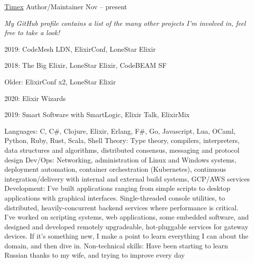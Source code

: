 \documentclass[10pt,a4paper]{article}
\begin{document}
\headedsection
  {\href{https://github.com/bitwalker/timex}{Timex}}{%
  \headedsubsection
    {Author/Maintainer}
    {Nov  -- present}
    {}}
    
\vspace{-0.2em}
\begin{center}
  \emph{\small My GitHub profile contains a list of the many other projects I'm involved in, feel free to take a look!}
\end{center}

\spacedhrule{-0.2em}{-0.4em}


\inlineheadsection
  {2019:}
  {CodeMesh LDN, ElixirConf, LoneStar Elixir}
  
\inlineheadsection
  {2018:}
  {The Big Elixir, LoneStar Elixir, CodeBEAM SF}
  
\inlineheadsection
  {Older:}
  {ElixirConf x2, LoneStar Elixir}
  
  

\inlineheadsection
  {2020:}
  {Elixir Wizards}
  
  
\inlineheadsection
  {2019:}
  {Smart Software with SmartLogic, Elixir Talk, ElixirMix}




\inlineheadsection  %
  {Languages:}
  {C, C\#, Clojure, Elixir, Erlang, F\#, Go, Javascript, Lua, OCaml, Python, Ruby, Rust, Scala, Shell}
\inlineheadsection
  {Theory:}
  {Type theory, compilers, interpreters, data structures and algorithms, distributed consensus, messaging and protocol design}
\inlineheadsection
  {Dev/Ops:}
  {Networking, administration of Linux and Windows systems, deployment automation, container orchestration (Kubernetes), continuous integration/delivery with internal and external build systems, GCP/AWS services}
\inlineheadsection
  {Development:}
  {I've built applications ranging from simple scripts to desktop applications with graphical interfaces. Single-threaded console utilities, to distributed, heavily-concurrent backend services where performance is critical. I've worked on scripting systems, web applications, some embedded software, and designed and developed remotely upgradeable, hot-pluggable services for gateway devices. If it's something new, I make a point to learn everything I can about the domain, and then dive in.}
\inlineheadsection
  {Non-technical skills:}
  {Have been starting to learn Russian thanks to my wife, and trying to improve every day}
\end{document}
